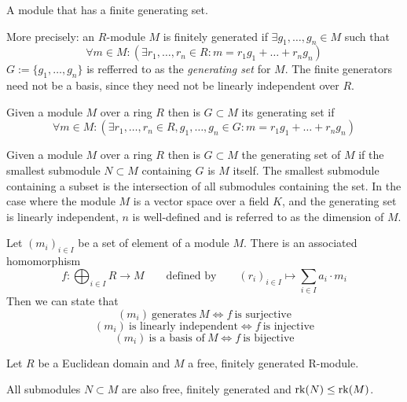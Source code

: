 \begin{definition}
   A module that has a finite generating set.
\end{definition}
\begin{remark}
   More precisely: an \(R\)-module \(M\) is finitely generated if \(\exists g_1, \ldots, g_n \in M\) such that
   \[\forall m \in M: (\exists r_1, \ldots, r_n \in R: m = r_1g_1 + \ldots + r_ng_n)\]
   \(G := \{g_1, \ldots, g_n\}\) is refferred to as the \emph{generating set} for \(M\).
   The finite generators need not be a basis, since they need not be linearly independent over \(R\).
\end{remark}

\begin{definition}
   Given a module \(M\) over a ring \(R\) then is \(G \subset M\) its generating set if
   \[\forall m \in M: (\exists r_1, \ldots, r_n \in R, g_1, \ldots, g_n \in G: m = r_1g_1 + \ldots + r_ng_n)\]
\end{definition}
\begin{remark}
   Given a module \(M\) over a ring \(R\) then is \(G \subset M\) the generating set of \(M\) if the smallest submodule \(N \subset M\) containing \(G\) is \(M\) itself.
   The smallest submodule containing a subset is the intersection of all submodules containing the set.
   In the case where the module \(M\) is a vector space over a field \(K\), and the generating set is linearly independent, \(n\) is well-defined and is referred to as the dimension of \(M\).
\end{remark}

Let \((m_i)_{i \in I}\) be a set of element of a module \(M\).
There is an associated homomorphism
\[f: \bigoplus_{i \in I} R \to M \qquad\text{defined by}\qquad (r_i)_{i \in I} \mapsto \sum_{i \in I} a_i \cdot m_i\]
Then we can state that
\[(m_i)~\text{generates}~M \iff f~\text{is surjective}\]
\[(m_i)~\text{is linearly independent} \iff f~\text{is injective}\]
\[(m_i)~\text{is a basis of}~M \iff f~\text{is bijective}\]

\begin{proposition}\label{pro:fin_gen_mod}
   Let \(R\) be a Euclidean domain and \(M\) a free, finitely generated R-module.

   All submodules \(N \subset M\) are also free, finitely generated and \(\operatorname{rk}(N) \leq \operatorname{rk}(M)\).
\end{proposition}

